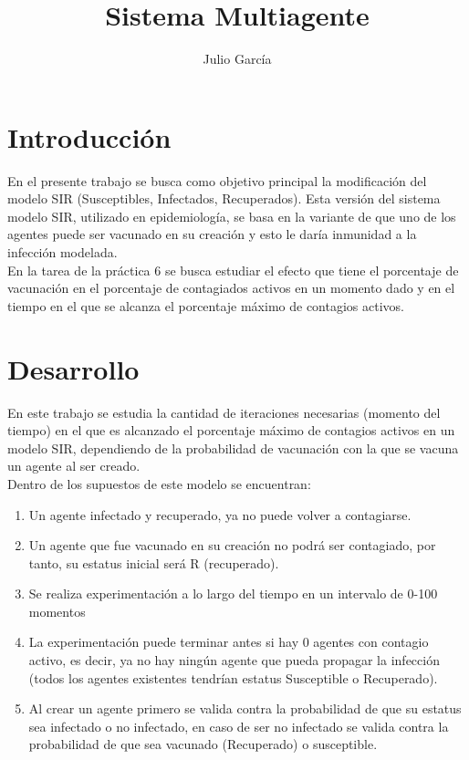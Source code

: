 \documentclass{article}
\title {Sistema Multiagente}
\author{Julio Garc\'ia}
\begin{document}
	\renewcommand{\listtablename}{Índice de tablas}
	\renewcommand{\tablename}{Cuadro}
	\maketitle
	
	\section{Introducción}
	En el presente trabajo se busca como objetivo principal la modificación del modelo SIR (Susceptibles, Infectados, Recuperados). Esta versión del sistema modelo SIR, utilizado en epidemiología, se basa en la variante de que uno de los agentes puede ser vacunado en su creación y esto le daría inmunidad a la infección modelada.\\
	En la tarea de la práctica 6 \cite{p6} se busca estudiar el efecto que tiene el porcentaje de vacunación en el porcentaje de contagiados activos en un momento dado y en el tiempo en el que se alcanza el porcentaje máximo de contagios activos.
	
	\section{Desarrollo}
	En este trabajo se estudia la cantidad de iteraciones necesarias (momento del tiempo) en el que es alcanzado el porcentaje máximo de contagios activos en un modelo SIR, dependiendo de la probabilidad de vacunación con la que se vacuna un agente al ser creado.\\ 
	Dentro de los supuestos de este modelo se encuentran:\\
	\begin{enumerate}
	\item Un agente infectado y recuperado, ya no puede volver a contagiarse.
	\item Un agente que fue vacunado en su creación no podrá ser contagiado, por tanto, su estatus inicial será R (recuperado).
	\item Se realiza experimentación a lo largo del tiempo en un intervalo de 0-100 momentos
	\item La experimentación puede terminar antes si hay 0 agentes con contagio activo, es decir, ya no hay ningún agente que pueda propagar la infección (todos los agentes existentes tendrían estatus Susceptible o Recuperado).
	\item Al crear un agente primero se valida contra la probabilidad de que su estatus sea infectado o no infectado, en caso de ser no infectado se valida contra la probabilidad de que sea vacunado (Recuperado) o susceptible.
	
	
	\end{enumerate}
\end{document}
